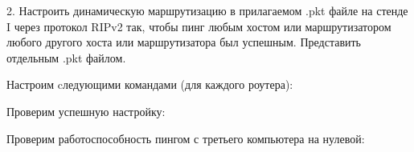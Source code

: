 \Large 2. Настроить динамическую маршрутизацию в прилагаемом .pkt файле на стенде I через протокол RIPv2 так, чтобы пинг любым хостом или маршрутизатором любого другого хоста или маршрутизатора был успешным.
Представить отдельным .pkt файлом. 


Настроим cледующими командами (для каждого роутера):

\begin{figure}[h]
\end{figure}
Проверим успешную настройку:
\begin{figure}[h]
\end{figure}
\newpage
Проверим работоспособность пингом с третьего компьютера на нулевой:

\begin{figure}[h]
\end{figure}

